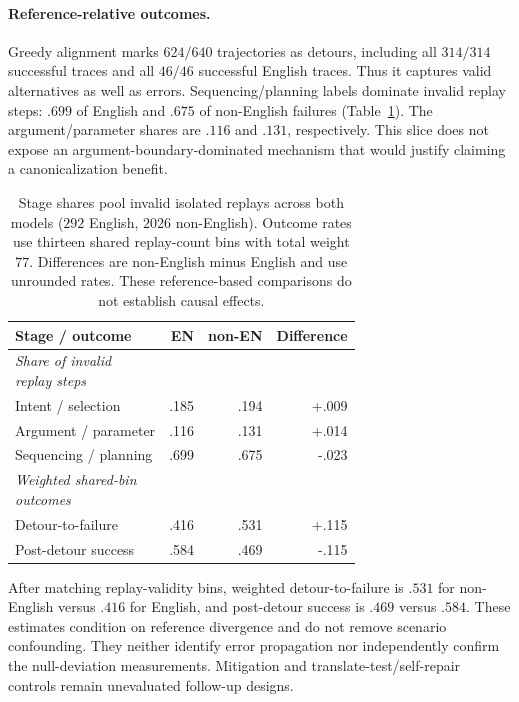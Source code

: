\documentclass[11pt]{article}
\begin{document}
\paragraph{Reference-relative outcomes.}
Greedy alignment marks $624/640$ trajectories as detours, including all
$314/314$ successful traces and all $46/46$ successful English traces. Thus it
captures valid alternatives as well as errors. Sequencing/planning labels
dominate invalid replay steps: $.699$ of English and $.675$ of non-English
failures (Table~\ref{tab:stage}). The argument/parameter shares are $.116$ and
$.131$, respectively. This slice does not expose an argument-boundary-dominated
mechanism that would justify claiming a canonicalization benefit.

\begin{table}[t]\centering\footnotesize
\setlength{\tabcolsep}{4pt}
\begin{tabular}{lrrr}\toprule
Stage / outcome & EN & non-EN & Difference \\ \midrule
\shortstack[l]{\textit{Share of invalid}\\\textit{replay steps}} & & &\\
Intent / selection & .185 & .194 & +.009 \\
Argument / parameter & .116 & .131 & +.014 \\
Sequencing / planning & .699 & .675 & -.023 \\ \midrule
\shortstack[l]{\textit{Weighted shared-bin}\\\textit{outcomes}} & & &\\
Detour-to-failure & .416 & .531 & +.115 \\
Post-detour success & .584 & .469 & -.115 \\ \bottomrule
\end{tabular}
\caption{Stage shares pool invalid isolated replays across both models
($292$ English, $2026$ non-English). Outcome rates use thirteen shared
replay-count bins with total weight $77$. Differences are non-English minus
English and use unrounded rates. These reference-based comparisons do not
establish causal effects.}
\label{tab:stage}\end{table}

After matching replay-validity bins, weighted detour-to-failure is $.531$ for
non-English versus $.416$ for English, and post-detour success is $.469$ versus $.584$.
These estimates condition on reference divergence and do not remove scenario
confounding. They neither identify error propagation nor independently confirm
the null-deviation measurements. Mitigation and translate-test/self-repair
controls remain unevaluated follow-up designs.
\end{document}
